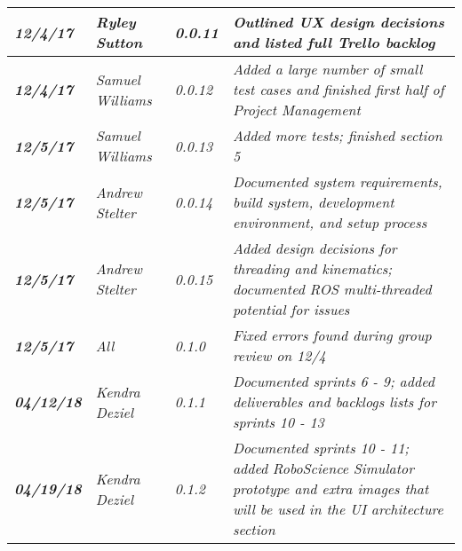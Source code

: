 \begin{tabular}{|>{\raggedright}p{1.5cm}|>{\raggedright}p{3cm}|>{\raggedright}p{1.5cm}|>{\raggedright}p{9cm}|}
\hline
\textit{\textbf{12/4/17}} & \textit{Ryley Sutton} & \textit{0.0.11} & \textit{Outlined UX design decisions and listed full Trello backlog}\tabularnewline
\hline
\textit{\textbf{12/4/17}} & \textit{Samuel Williams} & \textit{0.0.12} & \textit{Added a large number of small test cases and finished first half of Project Management}\tabularnewline
\hline
\textit{\textbf{12/5/17}} & \textit{Samuel Williams} & \textit{0.0.13} & \textit{Added more tests; finished section 5}\tabularnewline
\hline
\textit{\textbf{12/5/17}} & \textit{Andrew Stelter} & \textit{0.0.14} & \textit{Documented system requirements, build system, development environment, and setup process}\tabularnewline
\hline
\textit{\textbf{12/5/17}} & \textit{Andrew Stelter} & \textit{0.0.15} & \textit{Added design decisions for threading and kinematics; documented ROS multi-threaded potential for issues}\tabularnewline
\hline
\textit{\textbf{12/5/17}} & \textit{All} & \textit{0.1.0} & \textit{Fixed errors found during group review on 12/4}\tabularnewline
\hline
\textit{\textbf{04/12/18}} & \textit{Kendra Deziel} & \textit{0.1.1} & \textit{Documented sprints 6 - 9; added deliverables and backlogs lists for sprints 10 - 13}\tabularnewline
\hline
\textit{\textbf{04/19/18}} & \textit{Kendra Deziel} & \textit{0.1.2} & \textit{Documented sprints 10 - 11; added RoboScience Simulator prototype and extra images that will be used in the UI architecture section}\tabularnewline
\hline
\end{tabular}
\vfill

